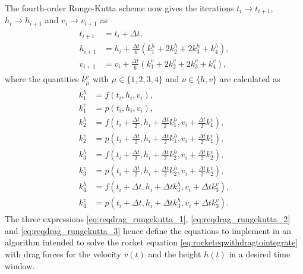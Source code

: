 \documentclass[a4paper,11pt]{report}
\begin{document}
The fourth-order Runge-Kutta scheme now gives the iterations $t_i \rightarrow t_{i+1}$, $h_i \rightarrow h_{i+1}$ and $v_i \rightarrow v_{i+1}$ as \begin{align}
	\begin{aligned}\label{eq:reqdrag_rungekutta_2}
		t_{i+1} &= t_i + \Delta t, \\
		h_{i+1} &= h_i + \frac{\Delta t}{6}(k_1^h+2k_2^h+2k_3^h+k_4^h), \\
		v_{i+1} &= v_i + \frac{\Delta t}{6}(k_1^v+2k_2^v+2k_3^v+k_4^v),
	\end{aligned}
\end{align} where the quantities $k_\mu^\nu$ with $\mu \in \{1,2,3,4\}$ and $\nu \in \{h,v\}$ are calculated as \begin{align}
\begin{aligned}\label{eq:reqdrag_rungekutta_3}
	k_1^h &= f(t_i,h_i,v_i), \\
	k_1^v &= p(t_i,h_i,v_i), \\
	k_2^h &= f\left(t_i+\frac{\Delta t}{2}, h_i + \frac{\Delta t}{2}k_1^h, v_i + \frac{\Delta t}{2}k_1^v\right), \\
	k_2^v &= p\left(t_i+\frac{\Delta t}{2}, h_i + \frac{\Delta t}{2}k_1^h, v_i + \frac{\Delta t}{2}k_1^v\right), \\
	k_3^h &= f\left(t_i+\frac{\Delta t}{2}, h_i + \frac{\Delta t}{2}k_2^h, v_i + \frac{\Delta t}{2}k_2^v\right), \\
	k_3^v &= p\left(t_i+\frac{\Delta t}{2}, h_i + \frac{\Delta t}{2}k_2^h, v_i + \frac{\Delta t}{2}k_2^v\right), \\
	k_4^h &= f\left(t_i+\Delta t, h_i + \Delta tk_3^h, v_i + \Delta t k_3^v\right), \\
	k_4^v &= p\left(t_i+\Delta t, h_i + \Delta tk_3^h, v_i + \Delta t k_3^v\right).
\end{aligned}
\end{align} The three expressions \cref{eq:reqdrag_rungekutta_1}, \cref{eq:reqdrag_rungekutta_2} and \cref{eq:reqdrag_rungekutta_3} hence define the equations to implement in an algorithm intended to solve the rocket equation \cref{eq:rocketeqwithdragtointegrate} with drag forces for the velocity $v(t)$ and the height $h(t)$ in a desired time window.
\end{document}
